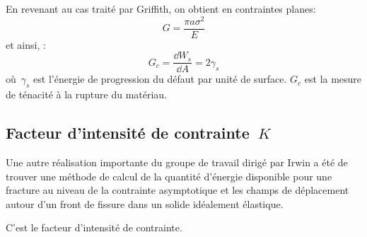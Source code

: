 \medskip
En revenant au cas traité par Griffith, on obtient en contraintes planes:
\begin{equation} G = \dfrac{\pi a\sigma^2}{E} \end{equation}
et ainsi, :
\begin{equation} G_c = \dfrac{\dd W_s}{\dd A}=2\gamma_s \end{equation}
où~$\gamma_s$ est l'énergie de progression du défaut par unité de surface.
$G_c$ est la mesure de ténacité à la rupture du matériau.


\medskip\ifVersionDuDocEstVincent\else\newpage\fi
\subsection{Facteur d'intensité de contrainte~$K$}

\medskip
\begin{histoire}%
\ifVersionDuDocEstVincent{}\selectfont\fi
Une autre réalisation importante du groupe de travail dirigé par Irwin a été de trouver une méthode de calcul de la quantité d'énergie disponible pour une fracture au niveau de la contrainte asymptotique et les champs de déplacement autour d'un front de fissure dans un solide idéalement élastique.

C'est le facteur d'intensité de contrainte.
\end{histoire}

